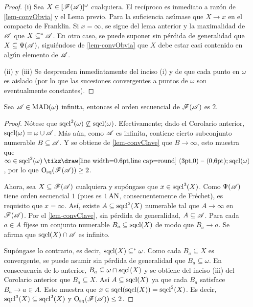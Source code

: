 \begin{proof}
	(i) Sea $X \in [\mathscr{F}(\mathscr{A})]^\omega$ cualquiera. El recíproco es inmediato a razón de \ref{lem-convObvia} y el Lema previo. Para la suficiencia asúmase que $X \to x$ en el compacto de Franklin. Si $x = \infty$, se sigue del lema anterior y la maximalidad de $\mathscr{A}$ que $X \subseteq^* \mathscr{A}$. En otro caso, se puede suponer sin pérdida de generalidad que $X \subseteq \Psi(\mathscr{A})$, siguiéndose de \ref{lem-convObvia} que $X$ debe estar casi contenido en algún elemento de $\mathscr{A}$.

	(ii) y (iii) Se desprenden inmediatamente del inciso (i) y de que cada punto en $\omega$ es aislado (por lo que las sucesiones convergentes a puntos de $\omega$ son eventualmente constantes).
\end{proof}

\begin{corolario}
	Sea $\mathscr{A} \in \operatorname{MAD}(\omega)$ infinita, entonces el orden secuencial de $\mathscr{F}(\mathscr{A})$ es $2$.
\end{corolario}

\begin{proof}
	Nótese que $\operatorname{sqcl}^2(\omega) \not\subseteq \operatorname{sqcl}(\omega)$. Efectivamente; dado el Corolario anterior, $\operatorname{sqcl}(\omega) = \omega \cup \mathscr{A}$. Más aún, como $\mathscr{A}$ es infinita, contiene cierto subconjunto numerable $B \subseteq \mathscr{A}$. Y se obtiene de \ref{lem-convClave} que $B \to \infty$, esto muestra que $\infty \in \scl^2(\omega) \setminus \scl(\omega)$, por lo que $\operatorname{O_{sq}}(\mathscr{F}(\mathscr{A})) \geq 2$.

	Ahora, sea $X \subseteq \mathscr{F}(\mathscr{A})$ cualquiera y supóngase que $x \in \operatorname{sqcl}^3(X)$. Como $\Psi(\mathscr{A})$ tiene orden secuencial $1$ (pues es $1\operatorname{AN}$, consecuentemente de Fréchet), es requisito que $x=\infty$. Así, existe $A \subseteq \operatorname{sqcl}^2(X)$ numerable tal que $A \to \infty$ en $\mathscr{F}(\mathscr{A})$. Por el \autoref{lem-convClave}, sin pérdida de generalidad, $A \subseteq \mathscr{A}$. Para cada $a \in A$ fíjese un conjunto numerable $B_a \subseteq \operatorname{sqcl}(X)$ de modo que $B_a \to a$. Se afirma que $\operatorname{sqcl}(X) \cap \mathscr{A}$ es infinito.

	Supóngase lo contrario, es decir, $\operatorname{sqcl}(X) \subseteq^* \omega$. Como cada $B_a \subseteq X$ es convergente, se puede asumir sin pérdida de generalidad que $B_a \subseteq \omega$. En consecuencia de lo anterior, $B_a \subseteq \omega \cap \operatorname{sqcl}(X)$ y se obtiene del inciso (iii) del Corolario anterior que $B_a \subseteq X$. Así $A \subseteq \operatorname{sqcl}(X)$ ya que cada $B_a$ satisface $B_a \to a \in A$. Esto muestra que $x \in \operatorname{sqcl}(\operatorname{sqcl}(X))=\operatorname{sqcl}^2(X)$. Es decir, $\operatorname{sqcl}^3(X) \subseteq \operatorname{sqcl}^2(X)$ y $\operatorname{O_{sq}}(\mathscr{F}(\mathscr{A})) \leq 2$.
\end{proof}

